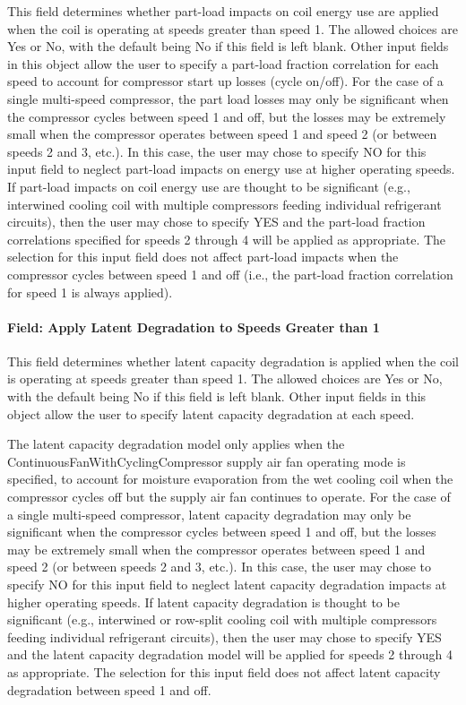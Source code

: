 This field determines whether part-load impacts on coil energy use are applied when the coil is operating at speeds greater than speed 1. The allowed choices are Yes or No, with the default being No if this field is left blank. Other input fields in this object allow the user to specify a part-load fraction correlation for each speed to account for compressor start up losses (cycle on/off). For the case of a single multi-speed compressor, the part load losses may only be significant when the compressor cycles between speed 1 and off, but the losses may be extremely small when the compressor operates between speed 1 and speed 2 (or between speeds 2 and 3, etc.). In this case, the user may chose to specify NO for this input field to neglect part-load impacts on energy use at higher operating speeds. If part-load impacts on coil energy use are thought to be significant (e.g., interwined cooling coil with multiple compressors feeding individual refrigerant circuits), then the user may chose to specify YES and the part-load fraction correlations specified for speeds 2 through 4 will be applied as appropriate. The selection for this input field does not affect part-load impacts when the compressor cycles between speed 1 and off (i.e., the part-load fraction correlation for speed 1 is always applied).

\paragraph{Field: Apply Latent Degradation to Speeds Greater than 1}\label{field-apply-latent-degradation-to-speeds-greater-than-1}

This field determines whether latent capacity degradation is applied when the coil is operating at speeds greater than speed 1. The allowed choices are Yes or No, with the default being No if this field is left blank. Other input fields in this object allow the user to specify latent capacity degradation at each speed.

The latent capacity degradation model only applies when the ContinuousFanWithCyclingCompressor supply air fan operating mode is specified, to account for moisture evaporation from the wet cooling coil when the compressor cycles off but the supply air fan continues to operate. For the case of a single multi-speed compressor, latent capacity degradation may only be significant when the compressor cycles between speed 1 and off, but the losses may be extremely small when the compressor operates between speed 1 and speed 2 (or between speeds 2 and 3, etc.). In this case, the user may chose to specify NO for this input field to neglect latent capacity degradation impacts at higher operating speeds. If latent capacity degradation is thought to be significant (e.g., interwined or row-split cooling coil with multiple compressors feeding individual refrigerant circuits), then the user may chose to specify YES and the latent capacity degradation model will be applied for speeds 2 through 4 as appropriate. The selection for this input field does not affect latent capacity degradation between speed 1 and off.

